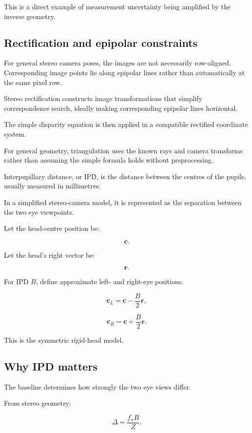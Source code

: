 This is a direct example of measurement uncertainty being amplified by the inverse geometry.

\subsection{Rectification and epipolar constraints}\label{02-foundations-ii-ch035-rectification-and-epipolar-constraints}

For general stereo camera poses, the images are not necessarily row-aligned. Corresponding image points lie along epipolar lines rather than automatically at the same pixel row.

Stereo rectification constructs image transformations that simplify correspondence search, ideally making corresponding epipolar lines horizontal.

The simple disparity equation is then applied in a compatible rectified coordinate system.

For general geometry, triangulation uses the known rays and camera transforms rather than assuming the simple formula holds without preprocessing.

Interpupillary distance, or IPD, is the distance between the centres of the pupils, usually measured in millimetres.

In a simplified stereo-camera model, it is represented as the separation between the two eye viewpoints.

Let the head-centre position be:

\[ \mathbf c. \]

Let the head's right vector be:

\[ \mathbf r. \]

For IPD \(B\), define approximate left- and right-eye positions:

\[ \boxed{ \mathbf c_L=\mathbf c-\frac B2\mathbf r, } \]

\[ \boxed{ \mathbf c_R=\mathbf c+\frac B2\mathbf r. } \]

This is the symmetric rigid-head model.

\subsection{Why IPD matters}\label{02-foundations-ii-ch035-why-ipd-matters}

The baseline determines how strongly the two eye views differ.

From stereo geometry:

\[ \Delta=\frac{f_xB}{Z}. \]

